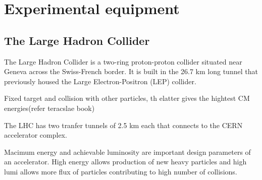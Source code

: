 
\chapter{Experimental equipment}
\label{sec:LHCATLAS}

\section{The Large Hadron Collider}
The Large Hadron Collider is a two-ring proton-proton collider situated near Geneva across the Swiss-French border. It is built in the 26.7 km long tunnel 
that previously housed the Large Electron-Positron (LEP) collider. 

Fixed target and collision with other particles, th elatter gives the hightest CM energies(refer teracslae book)

The LHC has two tranfer tunnels of 2.5 km each that connects to the CERN accelerator complex. 

Macimum energy and achievable luminosity are important design parameters of an accelerator. High energy allows production of new heavy particles and high 
lumi allows more flux of particles contributing to high number of collisions.